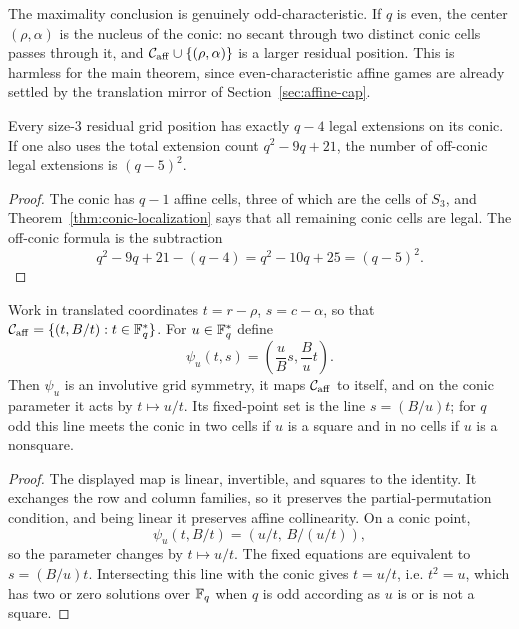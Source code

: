 \begin{remark}
\label{rem:even-conic-nucleus}
The maximality conclusion is genuinely odd-characteristic. If $q$ is even, the center
$(\rho,\alpha)$ is the nucleus of the conic: no secant through two distinct conic cells
passes through it, and $\mathcal C_{\rm aff}\cup\{(\rho,\alpha)\}$ is a larger residual
position. This is harmless for the main theorem, since even-characteristic affine games are
already settled by the translation mirror of Section~\ref{sec:affine-cap}.
\end{remark}

\begin{corollary}
\label{cor:on-conic-count}
Every size-$3$ residual grid position has exactly $q-4$ legal extensions on its conic. If
one also uses the total extension count $q^2-9q+21$, the number of off-conic legal extensions
is $(q-5)^2$.
\end{corollary}

\begin{proof}
The conic has $q-1$ affine cells, three of which are the cells of $S_3$, and
Theorem~\ref{thm:conic-localization} says that all remaining conic cells are legal. The
off-conic formula is the subtraction
\[
  q^2-9q+21-(q-4)=q^2-10q+25=(q-5)^2.
\]
\end{proof}

\begin{lemma}
\label{lem:psi-u}
Work in translated coordinates $t=r-\rho$, $s=c-\alpha$, so that
$\mathcal C_{\rm aff}=\{(t,B/t):t\in\mathbb{F}_q^\ast\}$. For $u\in\mathbb{F}_q^\ast$ define
\[
  \psi_u(t,s)=\left(\frac{u}{B}s,\frac{B}{u}t\right).
\]
Then $\psi_u$ is an involutive grid symmetry, it maps $\mathcal C_{\rm aff}$ to itself, and
on the conic parameter it acts by $t\mapsto u/t$. Its fixed-point set is the line
$s=(B/u)t$; for $q$ odd this line meets the conic in two cells if $u$ is a square and in no
cells if $u$ is a nonsquare.
\end{lemma}

\begin{proof}
The displayed map is linear, invertible, and squares to the identity. It exchanges the row
and column families, so it preserves the partial-permutation condition, and being linear it
preserves affine collinearity. On a conic point,
\[
  \psi_u(t,B/t)=\left(u/t,\,B/(u/t)\right),
\]
so the parameter changes by $t\mapsto u/t$. The fixed equations are equivalent to
$s=(B/u)t$. Intersecting this line with the conic gives $t=u/t$, i.e. $t^2=u$, which has
two or zero solutions over $\mathbb{F}_q$ when $q$ is odd according as $u$ is or is not a square.
\end{proof}

